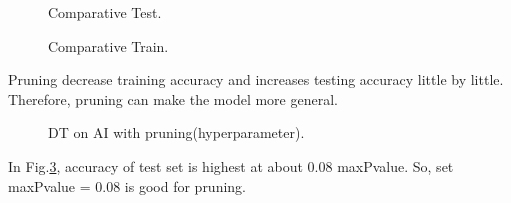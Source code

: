 \documentclass[a4 paper]{article}
\numberwithin{equation}{section}
\newcommand{\0}{\mathbf{0}}
\begin{document}
\begin{figure}[!htb]
    \caption{Comparative Test.}
    \label{fig:dataset}
\end{figure}


\begin{figure}[!htb]
    \caption{Comparative Train.}
    \label{fig:dataset}
\end{figure}

Pruning decrease training accuracy and increases testing accuracy little by little. Therefore, pruning can make the model more general.

\begin{figure}[!htb]
    \caption{DT on AI with pruning(hyperparameter).}
    \label{fig:dataset}
\end{figure}

In Fig.\ref{fig:dataset}, accuracy of test set is highest at about 0.08 maxPvalue. So, set maxPvalue = 0.08 is good for pruning.   
\end{document}
